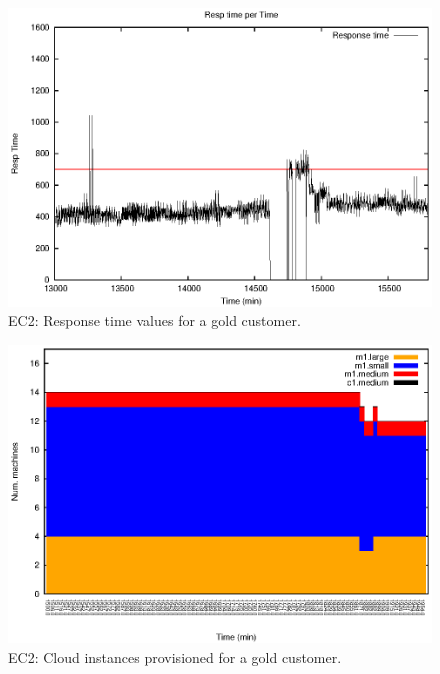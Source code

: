 \begin{figure}
  \begin{center}
    \includegraphics[width=.85\linewidth]{images/exps2011/high/ec2/proxyDataPoints_output_filtered.eps}
  \end{center}
\vspace{-5mm}
  \caption{EC2: Response time values for a gold customer.}
  \label{zoomOutage}
\end{figure}

\begin{figure}
  \begin{center}
    \includegraphics[width=.85\linewidth]{images/exps2011/high/ec2/inst_type_machines_filtered.eps}
  \end{center}
\vspace{-5mm}
  \caption{EC2: Cloud instances provisioned for a gold customer.}
  \label{resOutage}
\end{figure}

